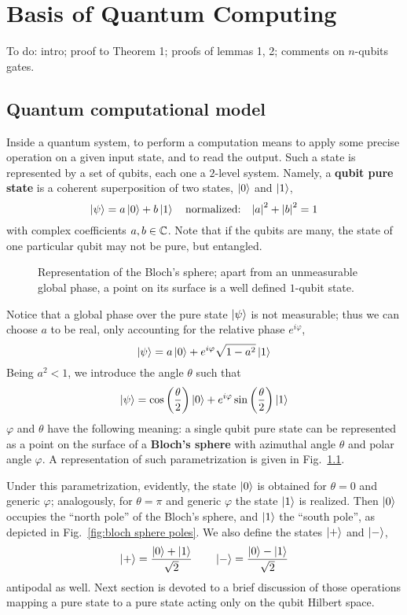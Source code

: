 \chapter{Basis of Quantum Computing}\label{chap:basis of quantum computing}\chaptertoc{}

{\color{palette-main} To do: intro; proof to Theorem 1; proofs of lemmas 1, 2; comments on $n$-qubits gates.}

\section{Quantum computational model}

Inside a quantum system, to perform a computation means to apply some precise operation on a given input state, and to read the output. Such a state is represented by a set of qubits, each one a $2$-level system. Namely, a \textbf{qubit pure state} is a coherent superposition of two states, $\ket{0}$ and $\ket{1}$,
\[
    \ket{\psi} = a \ket{0} + b \ket{1}
    \qq{normalized:}
    \abs{a}^2 + \abs{b}^2 = 1
\]
with complex coefficients $a,b \in\mathbb{C}$. Note that if the qubits are many, the state of one particular qubit may not be pure, but entangled.

\begin{figure}
    \centering
    
    \caption{Representation of the Bloch's sphere; apart from an unmeasurable global phase, a point on its surface is a well defined $1$-qubit state.}
    \label{fig:bloch sphere}
\end{figure}

Notice that a global phase over the pure state $\ket{\psi}$ is not measurable; thus we can choose $a$ to be real, only accounting for the relative phase $e^{i \varphi}$,
\[
    \ket{\psi} = a \ket{0} + e^{i\varphi} \sqrt{1-a^2} \ket{1}
\]
Being $a^2 < 1$, we introduce the angle $\theta$ such that
\[
    \ket{\psi} = \cos \left({\frac{\theta}{2}}\right) \ket{0} + e^{i\varphi} \sin \left({\frac{\theta}{2}}\right) \ket{1}
\]
$\varphi$ and $\theta$ have the following meaning: a single qubit pure state can be represented as a point on the surface of a \textbf{Bloch's sphere} with azimuthal angle $\theta$ and polar angle $\varphi$. A representation of such parametrization is given in Fig.~\ref{fig:bloch sphere}.

Under this parametrization, evidently, the state $\ket{0}$ is obtained for $\theta=0$ and generic $\varphi$; analogously, for $\theta=\pi$ and generic $\varphi$ the state $\ket{1}$ is realized. Then $\ket{0}$ occupies the ``north pole'' of the Bloch's sphere, and $\ket{1}$ the ``south pole'', as depicted in Fig.~\ref{fig:bloch sphere poles}. We also define the states $\ket{+}$ and $\ket{-}$,
\[
    \ket{+} = \frac{\ket{0} + \ket{1}}{\sqrt{2}}
    \qquad
    \ket{-} = \frac{\ket{0} - \ket{1}}{\sqrt{2}}
\]
antipodal as well. Next section is devoted to a brief discussion of those operations mapping a pure state to a pure state acting only on the qubit Hilbert space.

